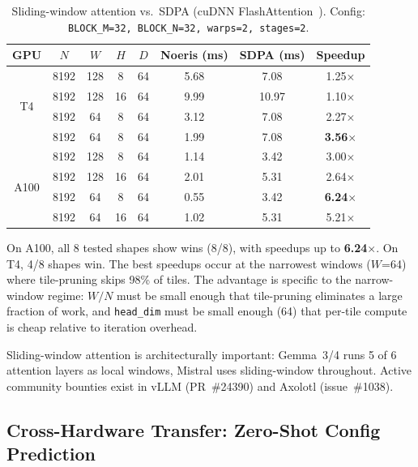 \documentclass[11pt]{article}
\begin{document}
\begin{table}[t]
\centering
\caption{Sliding-window attention vs.\ SDPA (cuDNN FlashAttention~\citep{flashattention}). Config: \texttt{BLOCK\_M=32, BLOCK\_N=32, warps=2, stages=2}.}
\label{tab:swa}
\small
\begin{tabular}{@{}cccccccc@{}}
\toprule
GPU & $N$ & $W$ & $H$ & $D$ & Noeris (ms) & SDPA (ms) & Speedup \\
\midrule
\multirow{4}{*}{T4} & 8192 & 128 & 8 & 64 & 5.68 & 7.08 & 1.25$\times$ \\
 & 8192 & 128 & 16 & 64 & 9.99 & 10.97 & 1.10$\times$ \\
 & 8192 & 64 & 8 & 64 & 3.12 & 7.08 & 2.27$\times$ \\
 & 8192 & 64 & 8 & 64 & 1.99 & 7.08 & \textbf{3.56$\times$} \\
\midrule
\multirow{4}{*}{A100} & 8192 & 128 & 8 & 64 & 1.14 & 3.42 & 3.00$\times$ \\
 & 8192 & 128 & 16 & 64 & 2.01 & 5.31 & 2.64$\times$ \\
 & 8192 & 64 & 8 & 64 & 0.55 & 3.42 & \textbf{6.24$\times$} \\
 & 8192 & 64 & 16 & 64 & 1.02 & 5.31 & 5.21$\times$ \\
\bottomrule
\end{tabular}
\end{table}

On A100, all 8 tested shapes show wins (8/8), with speedups up to
\textbf{6.24$\times$}. On T4, 4/8 shapes win. The best speedups occur at the
narrowest windows ($W$=64) where tile-pruning skips 98\% of tiles. The advantage
is specific to the narrow-window regime: $W/N$ must be small enough that
tile-pruning eliminates a large fraction of work, and \texttt{head\_dim} must be
small enough (64) that per-tile compute is cheap relative to iteration overhead.

Sliding-window attention is architecturally important: Gemma~3/4 runs 5 of 6
attention layers as local windows, Mistral uses sliding-window throughout.
Active community bounties exist in vLLM (PR~\#24390) and Axolotl (issue~\#1038).


\subsection{Cross-Hardware Transfer: Zero-Shot Config Prediction}
\label{sec:cross-hw-transfer}
\end{document}
